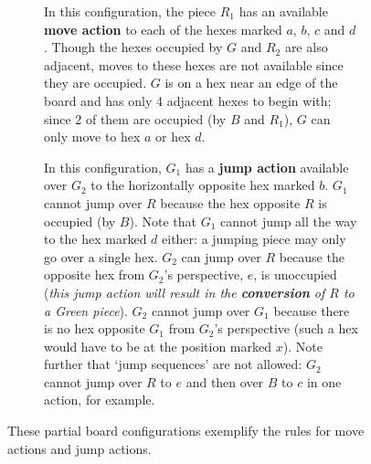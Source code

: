 \documentclass[]{article}
\newcommand{\piece}[4] {
    \node[draw,circle,minimum size=6.8mm,fill=white] at ({#1}, {#2}) {};
    \node[draw,circle,minimum size=5.8mm,very thick,{#3}] at ({#1}, {#2}) {};
    \node[] at ({#1}, {#2}) {${#4}$};
}
\newcommand{\board} {
    \tikzset{
        hex/.style={
            regular polygon,
            regular polygon sides=6,
            minimum size=10mm,
            inner sep=0mm,
            outer sep=0mm,
            rotate=30,
            draw
        },
        x={(4.33mm,7.5mm)},
        y={(8.66mm,0mm)}
    }
    \foreach \r/\q in {
                 +3/-3,+3/-2,+3/-1,+3/+0,
              +2/-3,+2/-2,+2/-1,+2/+0,+2/+1,
           +1/-3,+1/-2,+1/-1,+1/+0,+1/+1,+1/+2,
        +0/-3,+0/-2,+0/-1,+0/+0,+0/+1,+0/+2,+0/+3,
           -1/-2,-1/-1,-1/+0,-1/+1,-1/+2,-1/+3,
              -2/-1,-2/+0,-2/+1,-2/+2,-2/+3,
                 -3/+0,-3/+1,-3/+2,-3/+3,
    }
        \node[hex,fill=black!5] at (\r, \q) {};
}
\begin{document}
\begin{figure}[ht!]
\centering
\begin{subfigure}{.35\textwidth}
    \centering
    \caption{\label{fig:move}
        In this configuration, the piece $R_1$ has an available
        \textbf{move action} to each of the hexes marked $a$, $b$, $c$
        and $d$. Though the hexes occupied by $G$ and $R_2$ are also
        adjacent, moves to these hexes are not available since they are
        occupied. $G$ is on a hex near an edge of the board and has only 4
        adjacent hexes to begin with; since 2 of them are occupied (by $B$
        and $R_1$), $G$ can only move to hex $a$ or hex $d$.
    }
\end{subfigure}
\begin{subfigure}{.01\textwidth}
\phantom{SP}
\end{subfigure}
\begin{subfigure}{.62\textwidth}
    \centering
    \caption{\label{fig:jump}
        In this configuration, $G_1$ has a \textbf{jump action} available
        over $G_2$ to the horizontally opposite hex marked $b$.
        $G_1$ cannot jump over $R$ because the hex opposite $R$
        is occupied (by $B$). Note that $G_1$ cannot jump all the way to
        the hex marked $d$ either: a jumping piece may only go over a single
        hex. $G_2$ can jump over $R$ because the opposite hex from
        $G_2$'s perspective, $e$, is unoccupied
        (\emph{this jump action will result in the \textbf{conversion}
        of $R$ to a Green piece}).
        $G_2$ cannot jump over $G_1$ because there is no hex opposite $G_1$
        from $G_2$'s perspective
        (such a hex would have to be at the position marked $x$).
        Note further that `jump sequences' are not allowed:
        $G_2$ cannot jump over $R$ to $e$ and then over $B$ to $c$
        in one action, for example.
    }
\end{subfigure}
\caption{\label{fig:movejump}
    These partial board configurations exemplify the rules for
    move actions and jump actions.
}
\end{figure}
\end{document}
